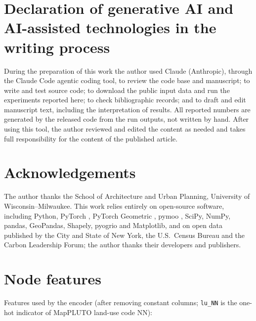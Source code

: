 \documentclass[preprint,12pt]{elsarticle}
\begin{document}
\section*{Declaration of generative AI and AI-assisted technologies in the writing process}
During the preparation of this work the author used Claude (Anthropic), through the Claude Code agentic coding tool, to review the code base and manuscript; to write and test source code; to download the public input data and run the experiments reported here; to check bibliographic records; and to draft and edit manuscript text, including the interpretation of results. All reported numbers are generated by the released code from the run outputs, not written by hand. After using this tool, the author reviewed and edited the content as needed and takes full responsibility for the content of the published article.

\section*{Acknowledgements}
The author thanks the School of Architecture and Urban Planning, University of Wisconsin--Milwaukee. This work relies entirely on open-source software, including Python, PyTorch \cite{paszke2019pytorch}, PyTorch Geometric \cite{fey2019pyg}, pymoo \cite{blank2020pymoo}, SciPy, NumPy, pandas, GeoPandas, Shapely, pyogrio and Matplotlib, and on open data published by the City and State of New York, the U.S.\ Census Bureau and the Carbon Leadership Forum; the author thanks their developers and publishers.

\appendix
\section{Node features}\label{app:features}
Features used by the encoder (after removing constant columns; \texttt{lu\_NN} is the one-hot indicator of MapPLUTO land-use code NN):

{\raggedright\small \par}


\end{document}
